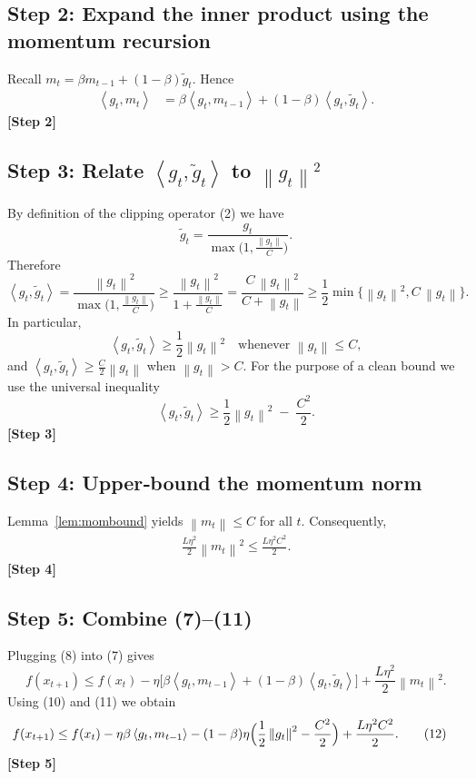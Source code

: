\documentclass{article}
\newcommand{\norm}[1]{\left\lVert#1\right\rVert}
\newcommand{\inner}[2]{\left\langle #1,#2\right\rangle}
\begin{document}
\subsection*{Step 2: Expand the inner product using the momentum recursion}
Recall $m_{t}= \beta m_{t-1}+(1-\beta)\tilde g_{t}$.
Hence
\begin{align}
\inner{g_{t}}{m_{t}}
&= \beta\inner{g_{t}}{m_{t-1}}+(1-\beta)\inner{g_{t}}{\tilde g_{t}}. \tag{8}
\end{align}
\textbf{[Step 2]}

\subsection*{Step 3: Relate $\inner{g_{t}}{\tilde g_{t}}$ to $\norm{g_{t}}^{2}$}
By definition of the clipping operator (2) we have
\[
\tilde g_{t}= \frac{g_{t}}{\max\!\bigl(1,\frac{\norm{g_{t}}}{C}\bigr)}.
\]
Therefore
\[
\inner{g_{t}}{\tilde g_{t}}
= \frac{\norm{g_{t}}^{2}}{\max\!\bigl(1,\frac{\norm{g_{t}}}{C}\bigr)}
\ge
\frac{\norm{g_{t}}^{2}}{1+\frac{\norm{g_{t}}}{C}}
= \frac{C\,\norm{g_{t}}^{2}}{C+\norm{g_{t}}}
\ge \frac{1}{2}\min\!\bigl\{ \norm{g_{t}}^{2}, C\,\norm{g_{t}}\bigr\}. \tag{9}
\]
In particular,
\[
\inner{g_{t}}{\tilde g_{t}}\ge \frac{1}{2}\norm{g_{t}}^{2} \quad\text{whenever }\norm{g_{t}}\le C,
\]
and $\inner{g_{t}}{\tilde g_{t}}\ge \frac{C}{2}\norm{g_{t}}$ when $\norm{g_{t}}>C$.
For the purpose of a clean bound we use the universal inequality
\[
\inner{g_{t}}{\tilde g_{t}}\ge \frac{1}{2}\norm{g_{t}}^{2}
\;-\;\frac{C^{2}}{2}. \tag{10}
\]
\textbf{[Step 3]}

\subsection*{Step 4: Upper‑bound the momentum norm}
Lemma~\ref{lem:mombound} yields $\norm{m_{t}}\le C$ for all $t$.  Consequently,
\begin{align}
\frac{L\eta^{2}}{2}\norm{m_{t}}^{2}
\le \frac{L\eta^{2}C^{2}}{2}. \tag{11}
\end{align}
\textbf{[Step 4]}

\subsection*{Step 5: Combine (7)–(11)}
Plugging (8) into (7) gives
\[
f(x_{t+1})\le f(x_{t})
-\eta\bigl[\beta\inner{g_{t}}{m_{t-1}}+(1-\beta)\inner{g_{t}}{\tilde g_{t}}\bigr]
+\frac{L\eta^{2}}{2}\norm{m_{t}}^{2}.
\]
Using (10) and (11) we obtain
\begin{align}
f(x_{t+1})
&\le f(x_{t})
-\eta\beta\inner{g_{t}}{m_{t-1}}
-(1-\beta)\eta\Bigl(\frac{1}{2}\norm{g_{t}}^{2}-\frac{C^{2}}{2}\Bigr)
+\frac{L\eta^{2}C^{2}}{2}. \tag{12}
\end{align}
\textbf{[Step 5]}
\end{document}
